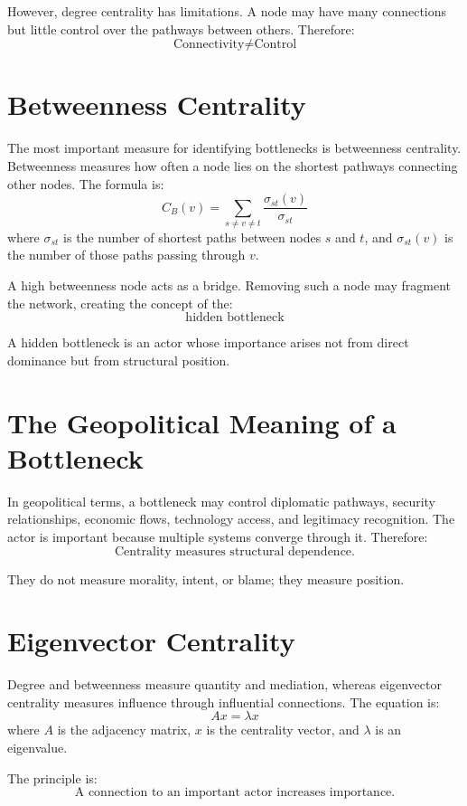 \documentclass[11pt,openany]{book}
\theoremstyle{plain}
\theoremstyle{definition}
\begin{document}
However, degree centrality has limitations. A node may have many connections but little control over the pathways between others. Therefore:
\[
\boxed{
\text{Connectivity} \neq \text{Control}
}
\]

\section*{Betweenness Centrality}

The most important measure for identifying bottlenecks is betweenness centrality. Betweenness measures how often a node lies on the shortest pathways connecting other nodes. The formula is:
\[
C_B(v) = \sum_{s \neq v \neq t} \frac{\sigma_{st}(v)}{\sigma_{st}}
\]
where \(\sigma_{st}\) is the number of shortest paths between nodes \(s\) and \(t\), and \(\sigma_{st}(v)\) is the number of those paths passing through \(v\).

A high betweenness node acts as a bridge. Removing such a node may fragment the network, creating the concept of the:
\[
\boxed{
\text{hidden bottleneck}
}
\]

A hidden bottleneck is an actor whose importance arises not from direct dominance but from structural position.

\section*{The Geopolitical Meaning of a Bottleneck}

In geopolitical terms, a bottleneck may control diplomatic pathways, security relationships, economic flows, technology access, and legitimacy recognition. The actor is important because multiple systems converge through it. Therefore:
\[
\boxed{
\text{Centrality measures structural dependence.}
}
\]

They do not measure morality, intent, or blame; they measure position.

\section*{Eigenvector Centrality}

Degree and betweenness measure quantity and mediation, whereas eigenvector centrality measures influence through influential connections. The equation is:
\[
A x = \lambda x
\]
where \(A\) is the adjacency matrix, \(x\) is the centrality vector, and \(\lambda\) is an eigenvalue.

The principle is:
\[
\boxed{
\text{A connection to an important actor increases importance.}
}
\]
\end{document}
